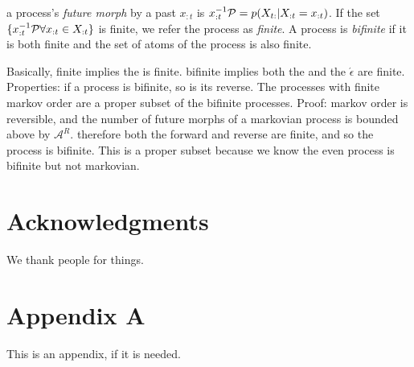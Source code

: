 \documentclass[prl,twocolumn,showpacs,superscriptaddress,preprintnumbers,floatfix]{revtex4-1}
\newcommand{\etomata}{\ensuremath{\acute{\epsilon}}\text{tomata}\xspace}
\begin{document}
a process's \emph{future morph} by a past $x_{:t}$ is $x_{:t}^{-1}\mathcal{P} =
p(X_{t:} | X_{:t} = x_{:t})$. If the set $\{ x_{:t}^{-1}\mathcal{P} \forall x_{:t}
\in X_{:t} \}$ is finite, we refer the process as \emph{finite}. A process is
\emph{bifinite} if it is both finite and the set of atoms of the process is also
finite.

Basically, finite implies the \eM is finite. bifinite implies both the
\eM and the \etomata are finite. Properties: if a process is bifinite, so
is its reverse. The processes with finite markov order are a proper subset of
the bifinite processes. Proof: markov order is reversible, and the number of
future morphs of a markovian process is bounded above by $\mathcal{A}^R$.
therefore both the forward and reverse \eMs are finite, and so the
process is bifinite. This is a proper subset because we know the even process is
bifinite but not markovian.

\section*{Acknowledgments}
\label{sec:acknowledgments}

We thank people for things.



\cleardoublepage

\appendix

\section{Appendix A}
\label{sec:appendix_a}

This is an appendix, if it is needed.
\end{document}

